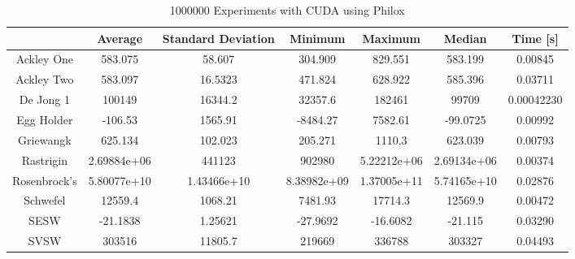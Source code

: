 \documentclass{article}
\begin{document}
	\begin{table}[h]
        \begin{centering}
            \begin{tabular}{|c||c|c|c|c|c|c|}
                \hline
                            & Average & Standard Deviation & Minimum & Maximum & Median & Time [s] \\
                \hline
                \hline
                Ackley One & 583.075 & 58.607 & 304.909 & 829.551 & 583.199 & 0.00845 \\
                \hline
                Ackley Two & 583.097 & 16.5323 & 471.824 & 628.922 & 585.396 & 0.03711 \\
                \hline
                De Jong 1 & 100149 & 16344.2 & 32357.6 & 182461 & 99709 & 0.00042230\\
                \hline
                Egg Holder & -106.53 & 1565.91 & -8484.27 & 7582.61 & -99.0725 & 0.00992 \\
                \hline
                Griewangk & 625.134 & 102.023 & 205.271 & 1110.3 & 623.039 & 0.00793 \\
                \hline
                Rastrigin & 2.69884e+06 & 441123 & 902980 & 5.22212e+06 & 2.69134e+06 & 0.00374 \\
                \hline
                Rosenbrock's & 5.80077e+10 & 1.43466e+10 & 8.38982e+09 & 1.37005e+11 & 5.74165e+10 & 0.02876 \\
                \hline
                Schwefel & 12559.4 & 1068.21 & 7481.93 & 17714.3 & 12569.9 & 0.00472 \\
                \hline
                SESW & -21.1838 & 1.25621 & -27.9692 & -16.6082 & -21.115 & 0.03290\\
                \hline
                SVSW & 303516 & 11805.7 & 219669 & 336788 & 303327 & 0.04493\\
                \hline
            \end{tabular}
            \caption{1000000 Experiments with CUDA using Philox}
        \end{centering}
        \end{table}
\end{document}
